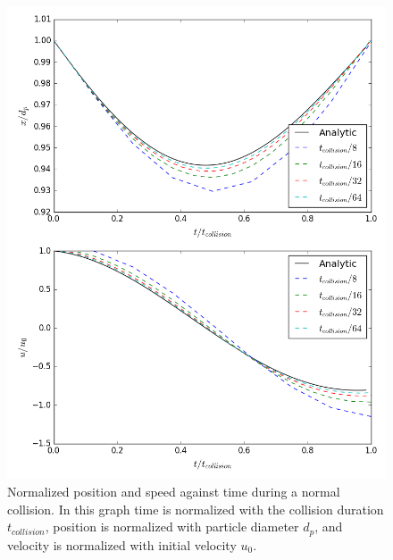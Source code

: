\documentclass[a4paper,11pt,titlepage]{report}
\begin{document}
\begin{figure}[!htb]
\centering
\includegraphics[scale=0.7]{figures/python_verification/normal_force_verification.png}
\caption{Normalized position and speed against time during a normal collision. In this graph time is normalized with the collision duration $t_{collision}$, position is normalized with particle diameter $d_p$, and velocity is normalized with initial velocity $u_0$.}
\label{fig:python_normal_force_verification}
\end{figure}
\end{document}
